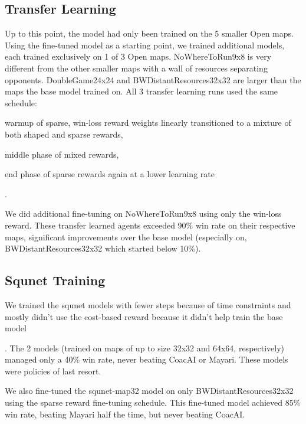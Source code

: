 \documentclass[conference]{IEEEtran}
\newif\ifsupplemental
\newcommand{\supptableref}[1]{%
  \ifsupplemental
    \ (Supplemental Table~\ref{#1})%
  \fi
}
\newcommand{\mapname}[1]{#1} %
\begin{document}
\subsection{Transfer Learning}
Up to this point, the model had only been trained on the 5 smaller Open maps. Using the
fine-tuned model as a starting point, we trained additional models, each trained exclusively
on 1 of 3 Open maps. \mapname{NoWhereToRun9x8} is very different from the other smaller maps with a wall of
resources separating opponents. \mapname{DoubleGame24x24} and \mapname{BWDistantResources32x32} are larger 
than the maps the base model trained on.
All 3 transfer learning runs used the same schedule:
\begin{inparaenum}[(1)]
    \item warmup of sparse, win-loss reward weights linearly transitioned to a mixture
    of both shaped and sparse rewards,
    \item middle phase of mixed rewards,
    \item end phase of sparse rewards again at a lower learning rate\supptableref{tab:transfer-learning-schedule}.
\end{inparaenum}
We did additional fine-tuning on \mapname{NoWhereToRun9x8} using only the win-loss
reward. These transfer learned agents exceeded 90\% win rate on their respective maps,
significant improvements over the base model (especially on,
\mapname{BWDistantResources32x32} which started below 10\%).

\subsection{Squnet Training}
We trained the squnet models with fewer steps because of time constraints and mostly
didn't use the cost-based reward because it didn't help train the base
model\supptableref{tab:squnet-training-parameters}. The 2 models (trained on maps of up
to size 32x32 and 64x64, respectively) managed only a 40\% win rate, never beating
CoacAI or Mayari. These models were policies of last resort.

We also fine-tuned the squnet-map32 model on only \mapname{BWDistantResources32x32}
using the sparse reward fine-tuning schedule. This fine-tuned 
model achieved 85\% win rate, beating Mayari half the time, but never beating CoacAI.
\end{document}
